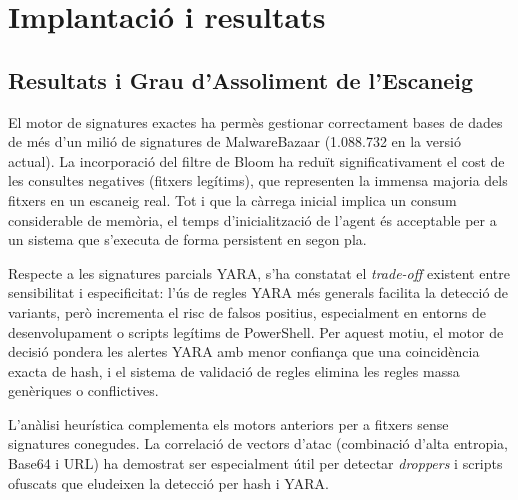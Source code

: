 \documentclass[12pt,a4paper]{report}
\begin{document}
\chapter{Implantació i resultats}
\label{ch:implantacio}

\section{Resultats i Grau d'Assoliment de l'Escaneig}
El motor de signatures exactes ha permès gestionar correctament bases de dades de més d'un milió de signatures de MalwareBazaar (1.088.732 en la versió actual). La incorporació del filtre de Bloom ha reduït significativament el cost de les consultes negatives (fitxers legítims), que representen la immensa majoria dels fitxers en un escaneig real. Tot i que la càrrega inicial implica un consum considerable de memòria, el temps d'inicialització de l'agent és acceptable per a un sistema que s'executa de forma persistent en segon pla.

Respecte a les signatures parcials YARA, s'ha constatat el \textit{trade-off} existent entre sensibilitat i especificitat: l'ús de regles YARA més generals facilita la detecció de variants, però incrementa el risc de falsos positius, especialment en entorns de desenvolupament o scripts legítims de PowerShell. Per aquest motiu, el motor de decisió pondera les alertes YARA amb menor confiança que una coincidència exacta de hash, i el sistema de validació de regles elimina les regles massa genèriques o conflictives.

L'anàlisi heurística complementa els motors anteriors per a fitxers sense signatures conegudes. La correlació de vectors d'atac (combinació d'alta entropia, Base64 i URL) ha demostrat ser especialment útil per detectar \textit{droppers} i scripts ofuscats que eludeixen la detecció per hash i YARA.
\end{document}
